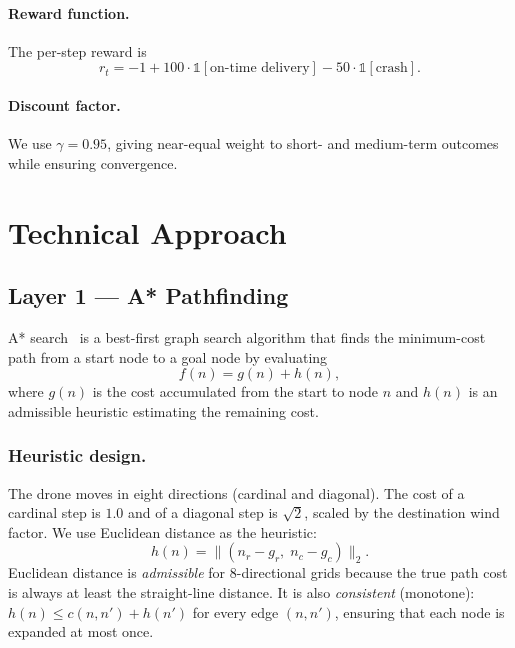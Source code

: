 \documentclass[11pt,twocolumn]{article}
\begin{document}
\paragraph{Reward function.}
The per-step reward is
\begin{equation}
r_t = -1 + 100 \cdot \mathbb{1}[\text{on-time delivery}]
           - 50  \cdot \mathbb{1}[\text{crash}].
\end{equation}

\paragraph{Discount factor.}
We use $\gamma = 0.95$, giving near-equal weight to short- and
medium-term outcomes while ensuring convergence.

\section{Technical Approach}
\label{sec:approach}

\subsection{Layer 1 --- A* Pathfinding}
\label{sec:astar}

A* search~\cite{hart1968} is a best-first graph search algorithm that
finds the minimum-cost path from a start node to a goal node by
evaluating
\begin{equation}
    f(n) = g(n) + h(n),
\end{equation}
where $g(n)$ is the cost accumulated from the start to node $n$ and
$h(n)$ is an admissible heuristic estimating the remaining cost.

\subsubsection{Heuristic design.}
The drone moves in eight directions (cardinal and diagonal).
The cost of a cardinal step is $1.0$ and of a diagonal step is
$\sqrt{2}$, scaled by the destination wind factor.
We use Euclidean distance as the heuristic:
\begin{equation}
    h(n) = \|(n_r - g_r,\; n_c - g_c)\|_2.
\end{equation}
Euclidean distance is \emph{admissible} for 8-directional grids because
the true path cost is always at least the straight-line distance.
It is also \emph{consistent} (monotone): $h(n) \leq c(n,n') + h(n')$
for every edge $(n,n')$, ensuring that each node is expanded at most
once.
\end{document}
